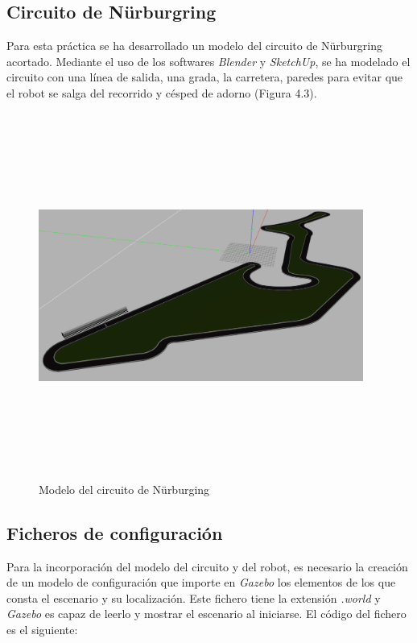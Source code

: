 \subsection{Circuito de Nürburgring}
Para esta práctica se ha desarrollado un modelo del circuito de Nürburgring acortado. Mediante el uso de los softwares \textit{Blender} y \textit{SketchUp}, se ha modelado el circuito con una línea de salida, una grada, la carretera, paredes para evitar que el robot se salga del recorrido y césped de adorno (Figura 4.3).

\begin{figure}[H]
  \begin{center}
    \includegraphics[width=0.95\textwidth, height=12cm]{figures/circuito.png}
		\caption{Modelo del circuito de Nürburging}
		\label{fig.circuito}
		\end{center}
\end{figure} 

\subsection{Ficheros de configuración} \label{sec.fichconf}
Para la incorporación del modelo del circuito y del robot, es necesario la creación de un modelo de configuración que importe en \textit{Gazebo} los elementos de los que consta el escenario y su localización. Este fichero tiene la extensión \textit{.world} y \textit{Gazebo} es capaz de leerlo y mostrar el escenario al iniciarse.
El código del fichero es el siguiente:

